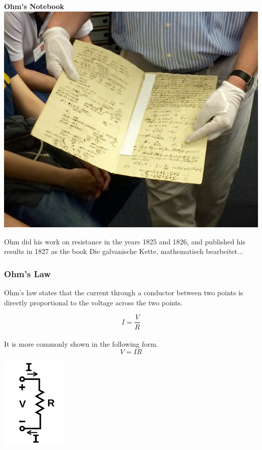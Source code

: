 \documentclass[fleqn]{beamer} %
\newcommand{\sectionIIsubsectionItitle}{Ohm's Law}
\begin{document}
\begin{frame}[label=sectionIIsubsectionI]
\begin{multicols}{3}
					{\bf Ohm's Notebook}
					\includegraphics[scale=.07]{images/Ohms_Laborbuch.jpg}	

				\end{multicols}
				Ohm did his work on resistance in the years 1825 and 1826, and published his results in 1827 as the book Die galvanische Kette, mathematisch bearbeitet...

			\end{frame}

		    \begin{frame}[label=sectionIIsubsectionI]
				\frametitle{\sectionIIsubsectionItitle}


				Ohm's law states that the current through a conductor between two points is directly proportional to the voltage across the two points. 

				\begin{multicols}{2}

					\[ I=\frac{V}{R}  \] \vspace{1mm}\\
					It is more commonly shown in the following form.
					\[ V=IR \]

					\includegraphics[scale=.8]{images/OhmsLaw.png}

				\end{multicols}

			\end{frame}	
\end{document}
